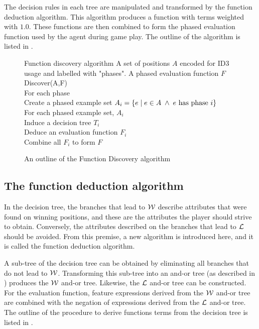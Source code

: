 \documentclass[twoside,11pt]{article}
\begin{document}
The decision rules in each tree are manipulated and transformed by the function deduction algorithm. This algorithm produces a function with terms weighted with $1.0$.  These functions are then combined to form the phased evaluation function used by the agent during game play.  The outline of the algorithm is listed in .  
\begin{figure}[h!]
\begin{algorithm}
{Function discovery algorithm}
{A set of positions $A$ encoded for ID3 usage and labelled with "phases".}
{A phased evaluation function $F$} 
Discover(A,F) \+\\
For each phase \+ \\
 Create a phased example set $A_i = \{ e \; | \; e \in A \;\wedge\; e \mbox{ has phase } i \} $ \-\\
For each phased example set, $A_i$ \+ \\ 
 Induce a decision tree $T_i$ \\
 Deduce an evaluation function $F_i$\- \\
Combine all $F_i$ to form $F$ 
\end{algorithm}
\caption{An outline of the Function Discovery algorithm}
\label{alg:fd}	
\end{figure}

\subsection{The function deduction algorithm}
\label{sec:deduce_function}
In the decision tree, the branches that lead to ${\cal W}$ describe attributes that were found on winning positions, and these are the attributes the player should strive to obtain.  Conversely, the attributes described on the branches that lead to ${\cal L}$ should be avoided.  From this premise, a new  algorithm is introduced here, and it is called the function deduction algorithm.  

A sub-tree of the decision tree can be obtained by eliminating all branches that do not lead to ${\cal W}$. Transforming this sub-tree into an and-or tree (as described in ) produces the ${\cal W}$ and-or tree.  Likewise, the ${\cal L}$ and-or tree can be constructed.  For the evaluation function, feature expressions derived from the ${\cal W}$ and-or tree are combined with the negation of expressions derived from the ${\cal L}$ and-or tree.  The outline of the procedure to derive functions terms from the decision tree is listed in .    
\end{document}
